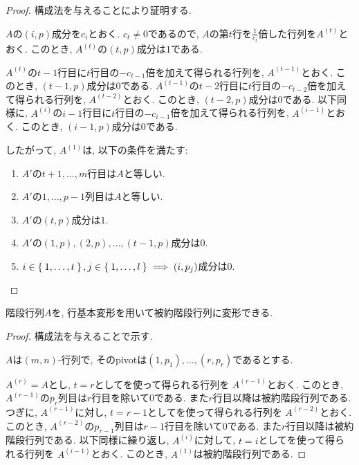 \begin{proof}
  構成法を与えることにより証明する.

  $A$の$(i,p)$成分を$c_i$とおく.
  $c_t\neq 0$であるので,
  $A$の第$t$行を$\frac{1}{c_t}$倍した行列を$A^{(t)}$とおく.
  このとき, $A^{(t)}$の$(t,p)$成分は$1$である.

  $A^{(t)}$の$t-1$行目に$t$行目の$-c_{t-1}$倍を加えて得られる行列を,
  $A^{(t-1)}$とおく.
  このとき, $(t-1,p)$成分は$0$である.
  $A^{(t-1)}$の$t-2$行目に$t$行目の$-c_{t-2}$倍を加えて得られる行列を,
  $A^{(t-2)}$とおく. このとき, $(t-2,p)$成分は$0$である.
  以下同様に,
  $A^{(i)}$の$i-1$行目に$t$行目の$-c_{i-1}$倍を加えて得られる行列を,
  $A^{(i-1)}$とおく.
  このとき, $(i-1,p)$成分は$0$である.
  
  したがって, $A^{(1)}$は, 以下の条件を満たす:
  \begin{enumerate}
  \item $A'$の$t+1,\ldots,m$行目は$A$と等しい.
  \item $A'$の$1,\ldots,p-1$列目は$A$と等しい.
  \item $A'$の$(t,p)$成分は$1$.
  \item $A'$の$(1,p),(2,p),\ldots,(t-1,p)$成分は$0$.
  \item $i\in\Set{1,\ldots,t}, j\in\Set{1,\ldots,l}\implies (i,p_j)$成分は$0$.
  \end{enumerate}
\end{proof}

\begin{theorem}
  \label{thm:reduction:b}
階段行列$A$を, 行基本変形を用いて被約階段行列に変形できる.
\end{theorem}



\begin{proof}
  構成法を与えることで示す.

  $A$は$(m,n)$-行列で, そのpivotは$(1,p_1),\ldots,(r,p_r)$であるとする.

  $A^{(r)}=A$とし, $t=r$としてを使って得られる行列を
  $A^{(r-1)}$とおく.
  このとき, $A^{(r-1)}$の$p_r$列目は$r$行目を除いて$0$である.
  また$r$行目以降は被約階段行列である.
  つぎに,
  $A^{(r-1)}$に対し, $t=r-1$としてを使って得られる行列を
  $A^{(r-2)}$とおく.
  このとき, $A^{(r-2)}$の$p_{r-1}$列目は$r-1$行目を除いて$0$である.
  また$r$行目以降は被約階段行列である.  
  以下同様に繰り返し,
  $A^{(i)}$に対して, 
  $t=i$としてを使って得られる行列を
  $A^{(i-1)}$とおく.  
  このとき, $A^{(1)}$は被約階段行列である.
\end{proof}

